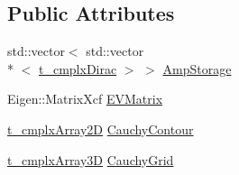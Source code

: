 \subsection*{Public Attributes}
\begin{DoxyCompactItemize}
\item 
std\-::vector$<$ std\-::vector\\*
$<$ \hyperlink{types_8h_ae924474dbd8b75d3e13a2674c4a06787}{t\-\_\-cmplx\-Dirac} $>$ $>$ \hyperlink{class_c___dedic_mem___b_s_e_a532449af372b4823ec11c1bac16a39f6}{Amp\-Storage}
\item 
Eigen\-::\-Matrix\-Xcf \hyperlink{class_c___dedic_mem___b_s_e_a5f0de44c8872d59b5db86058088e040e}{E\-V\-Matrix}
\item 
\hyperlink{types_8h_a4db8c78f1689c3a957b2866daaae58f2}{t\-\_\-cmplx\-Array2\-D} \hyperlink{class_c___dedic_mem___b_s_e_adcbf7c4206df13acafeab297bc039f29}{Cauchy\-Contour}
\item 
\hyperlink{types_8h_a13088102853997a3c148dfe29c372f85}{t\-\_\-cmplx\-Array3\-D} \hyperlink{class_c___dedic_mem___b_s_e_a0d11282e491e4762101a83d7e80e5733}{Cauchy\-Grid}
\end{DoxyCompactItemize}


